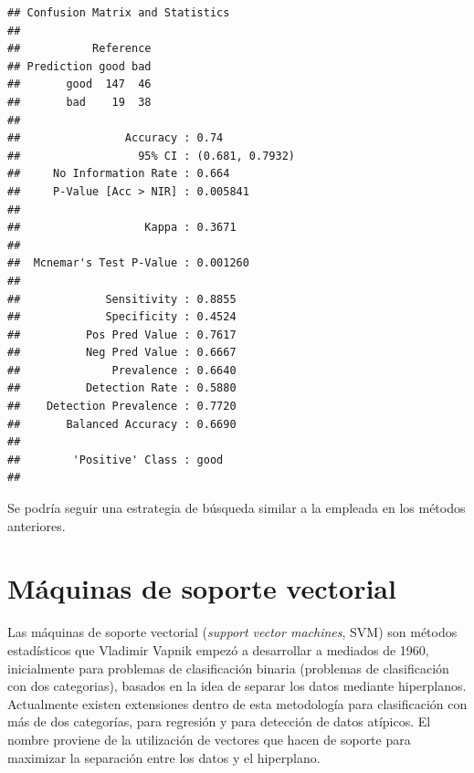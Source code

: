 \documentclass[
  spanish,
]{book}
\newenvironment{Shaded}{\begin{snugshade}}{\end{snugshade}}
\newcommand{\AttributeTok}[1]{\textcolor[rgb]{0.77,0.63,0.00}{#1}}
\newcommand{\FunctionTok}[1]{\textcolor[rgb]{0.00,0.00,0.00}{#1}}
\newcommand{\NormalTok}[1]{#1}
\newcommand{\SpecialCharTok}[1]{\textcolor[rgb]{0.00,0.00,0.00}{#1}}
\theoremstyle{break}
\theoremstyle{definition}
\theoremstyle{definition}
\theoremstyle{definition}
\theoremstyle{definition}
\theoremstyle{remark}
\begin{document}
\begin{Shaded}
\end{Shaded}

\begin{verbatim}
## Confusion Matrix and Statistics
## 
##           Reference
## Prediction good bad
##       good  147  46
##       bad    19  38
##                                          
##                Accuracy : 0.74           
##                  95% CI : (0.681, 0.7932)
##     No Information Rate : 0.664          
##     P-Value [Acc > NIR] : 0.005841       
##                                          
##                   Kappa : 0.3671         
##                                          
##  Mcnemar's Test P-Value : 0.001260       
##                                          
##             Sensitivity : 0.8855         
##             Specificity : 0.4524         
##          Pos Pred Value : 0.7617         
##          Neg Pred Value : 0.6667         
##              Prevalence : 0.6640         
##          Detection Rate : 0.5880         
##    Detection Prevalence : 0.7720         
##       Balanced Accuracy : 0.6690         
##                                          
##        'Positive' Class : good           
## 
\end{verbatim}

Se podría seguir una estrategia de búsqueda similar a la empleada en los métodos anteriores.

\hypertarget{svm}{%
\chapter{Máquinas de soporte vectorial}\label{svm}}

Las máquinas de soporte vectorial (\emph{support vector machines}, SVM) son métodos estadísticos que Vladimir Vapnik empezó a desarrollar a mediados de 1960, inicialmente para problemas de clasificación binaria (problemas de clasificación con dos categorias), basados en la idea de separar los datos mediante hiperplanos. Actualmente existen extensiones dentro de esta metodología para clasificación con más de dos categorías, para regresión y para detección de datos atípicos. El nombre proviene de la utilización de vectores que hacen de soporte para maximizar la separación entre los datos y el hiperplano.
\end{document}
